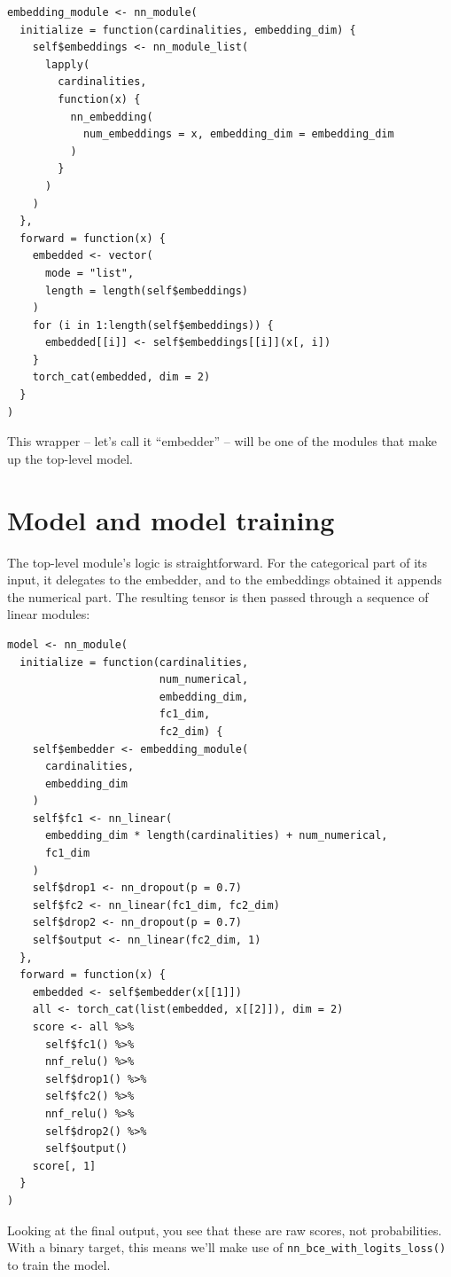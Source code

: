 \documentclass[
  letterpaper,
]{krantz}
\begin{document}
\begin{verbatim}
embedding_module <- nn_module(
  initialize = function(cardinalities, embedding_dim) {
    self$embeddings <- nn_module_list(
      lapply(
        cardinalities,
        function(x) {
          nn_embedding(
            num_embeddings = x, embedding_dim = embedding_dim
          )
        }
      )
    )
  },
  forward = function(x) {
    embedded <- vector(
      mode = "list",
      length = length(self$embeddings)
    )
    for (i in 1:length(self$embeddings)) {
      embedded[[i]] <- self$embeddings[[i]](x[, i])
    }
    torch_cat(embedded, dim = 2)
  }
)
\end{verbatim}

This wrapper -- let's call it ``embedder'' -- will be one of the modules
that make up the top-level model.

\hypertarget{model-and-model-training}{%
\section{Model and model training}\label{model-and-model-training}}

The top-level module's logic is straightforward. For the categorical
part of its input, it delegates to the embedder, and to the embeddings
obtained it appends the numerical part. The resulting tensor is then
passed through a sequence of linear modules:

\begin{verbatim}
model <- nn_module(
  initialize = function(cardinalities,
                        num_numerical,
                        embedding_dim,
                        fc1_dim,
                        fc2_dim) {
    self$embedder <- embedding_module(
      cardinalities,
      embedding_dim
    )
    self$fc1 <- nn_linear(
      embedding_dim * length(cardinalities) + num_numerical,
      fc1_dim
    )
    self$drop1 <- nn_dropout(p = 0.7)
    self$fc2 <- nn_linear(fc1_dim, fc2_dim)
    self$drop2 <- nn_dropout(p = 0.7)
    self$output <- nn_linear(fc2_dim, 1)
  },
  forward = function(x) {
    embedded <- self$embedder(x[[1]])
    all <- torch_cat(list(embedded, x[[2]]), dim = 2)
    score <- all %>%
      self$fc1() %>%
      nnf_relu() %>%
      self$drop1() %>%
      self$fc2() %>%
      nnf_relu() %>%
      self$drop2() %>%
      self$output()
    score[, 1]
  }
)
\end{verbatim}

Looking at the final output, you see that these are raw scores, not
probabilities. With a binary target, this means we'll make use of
\texttt{nn\_bce\_with\_logits\_loss()} to train the model.
\end{document}

